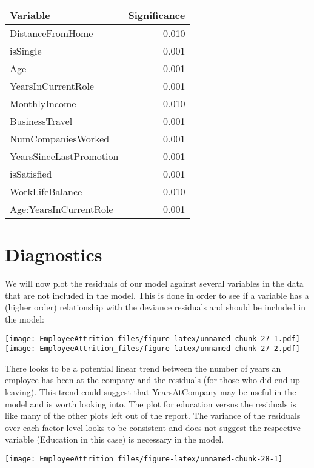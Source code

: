 \documentclass[]{article}
\begin{document}
\begin{tabular}{l|r}
\hline
Variable & Significance\\
\hline
DistanceFromHome & 0.010\\
\hline
isSingle & 0.001\\
\hline
Age & 0.001\\
\hline
YearsInCurrentRole & 0.001\\
\hline
MonthlyIncome & 0.010\\
\hline
BusinessTravel & 0.001\\
\hline
NumCompaniesWorked & 0.001\\
\hline
YearsSinceLastPromotion & 0.001\\
\hline
isSatisfied & 0.001\\
\hline
WorkLifeBalance & 0.010\\
\hline
Age:YearsInCurrentRole & 0.001\\
\hline
\end{tabular}

\hypertarget{diagnostics}{%
\section{Diagnostics}\label{diagnostics}}

We will now plot the residuals of our model against several variables in
the data that are not included in the model. This is done in order to
see if a variable has a (higher order) relationship with the deviance
residuals and should be included in the model:

\texttt{[image: EmployeeAttrition\_files/figure-latex/unnamed-chunk-27-1.pdf]}
\texttt{[image: EmployeeAttrition\_files/figure-latex/unnamed-chunk-27-2.pdf]}

There looks to be a potential linear trend between the number of years
an employee has been at the company and the residuals (for those who did
end up leaving). This trend could suggest that YearsAtCompany may be
useful in the model and is worth looking into. The plot for education
versus the residuals is like many of the other plots left out of the
report. The variance of the residuals over each factor level looks to be
consistent and does not suggest the respective variable (Education in
this case) is necessary in the model.

\begin{center}\texttt{[image: EmployeeAttrition\_files/figure-latex/unnamed-chunk-28-1]} \end{center}
\end{document}
